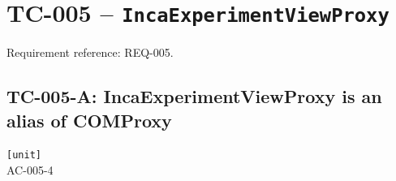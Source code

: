 \section{TC-005 -- \texttt{IncaExperimentViewProxy}}
\label{sec:tc005}

Requirement reference: REQ-005.

\subsection{TC-005-A: IncaExperimentViewProxy is an alias of COMProxy}

\begin{tcbox}
 \texttt{[unit]}\\
 AC-005-4

\medskip
\given{}
\end{tcbox}